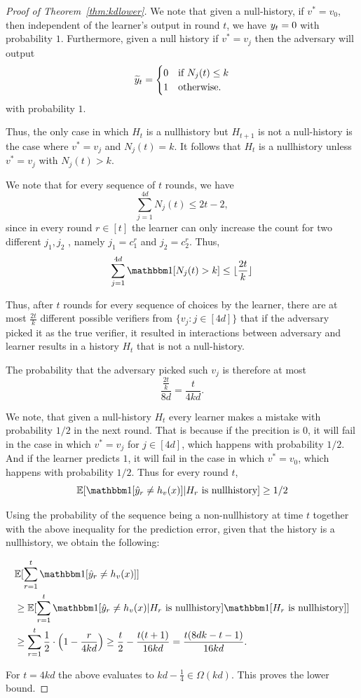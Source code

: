 \documentclass[11pt,letterpaper]{article}
\theoremstyle{definition}
\theoremstyle{plain}
\begin{document}
\begin{proof}[Proof of Theorem~\ref{thm:kdlower}]
We note that given a null-history, if $v^* = v_0$, then independent of the learner's output in round $t$, we have $y_t = 0$ with probability $1$.
Furthermore, given a null history if $v^* = v_j$ then the adversary will output
\[ {\widetilde{y}}_t = \begin{cases}
    0 &\text{if } N_{j}(t) \leq k \\
        1 &\text{otherwise.}
\end{cases}\]
with probability $1$.

Thus, the only case in which $H_t$ is a nullhistory but $H_{t+1}$ is not a null-history is the case where
$v^* = v_j$ and $ N_j(t) = k $.
It follows that $H_t$ is a nullhistory unless $v^* =v_j$ with $N_j(t) >k$.



We note that for every sequence of $t$ rounds, we have
\[
\sum_{j=1}^{4d} N_j(t) \leq 2t-2,
\]
since in every round $r \in [t]$ the learner can only increase the count for two different $j_1,j_2$ , namely $j_1= c_1^r$ and $j_2 = c_2^r$. 
Thus,
\[
\sum_{j=1}^{4d} \indct[N_j(t) > k] \leq \lfloor \frac{2t}{k} \rfloor
\]

Thus, after $t$ rounds for every sequence of choices by the learner, there are at most $\frac{2t}{k}$ different possible verifiers from $\{v_j: j\in [4d]\}$ that if the adversary picked it as the true verifier, it resulted in interactions between adversary and learner results in a history $H_t$ that is not a null-history.

The probability that the adversary picked such $v_j$ is therefore at most
\[ \frac{\frac{2t}{k}}{8d} = \frac{t}{4kd}.\]


We note, that given a null-history $H_t$ every learner makes a mistake with probability $1/2$ in the next round. That is because if the precition is $0$, it will fail in the case in which $v^*= v_j$ for $j\in [4d]$, which happens with probability $1/2$. And if the learner predicts $1$, it will fail in the case in which $v^* =v_0$, which happens with probability $1/2$.
Thus for every round $t$, 
\[\mathbb{E} [\indct[\hy_r \neq h_v(x)]|H_r \text{ is nullhistory}]  \geq 1/2\]

Using the probability of the sequence being a non-nullhistory at time $t$ together with the above inequality for the prediction error, given that the history is a nullhistory, we obtain the following:

\begin{align*}
   &\mathbb{E}[\sum_{r=1}^t  \indct[\hy_r \neq h_v(x)]]\\
   &\geq
   \mathbb{E} [\sum_{r=1}^t  \indct[\hy_r \neq h_v(x)|H_r \text{ is nullhistory}] \indct[H_r \text{ is nullhistory}]] \\
 & \geq \sum_{r=1}^t \frac{1}{2} \cdot \left(1-\frac{r}{4kd} \right)
   \geq \frac{t}{2}-\frac{t(t+1)}{16kd}  = \frac{t(8dk -t-1)}{16kd}.
\end{align*}

For $t = 4kd $ the above evaluates to $kd -\frac{1}{4} \in \Omega(kd)$. This proves the lower bound.
\end{proof}
\end{document}
